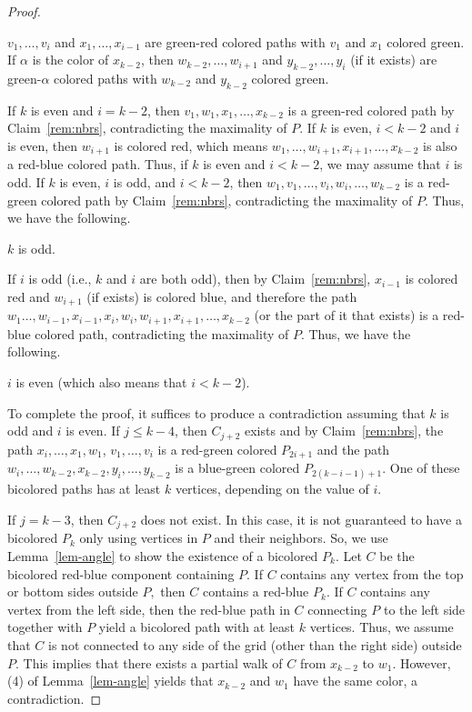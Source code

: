 \documentclass[10pt,a4paper]{amsart}
\begin{document}
\begin{proof}
\begin{claim}\label{rem:nbrs}
$v_1,\dots,v_i$ and $x_1,\dots,x_{i-1}$ are green-red colored paths with $v_1$ and $x_1$ colored green. If $\alpha$ is the color of $x_{k-2}$, then $w_{k-2},\dots,w_{i+1}$ and $y_{k-2},\dots,y_i$ (if it exists) are green-$\alpha$ colored paths with $w_{k-2}$ and $y_{k-2}$ colored green. 
\end{claim} 
 

If $k$ is even and $i=k-2$, then $v_1,w_1,x_1,\dots,x_{k-2}$ is a green-red colored path by Claim~\ref{rem:nbrs}, contradicting the maximality of $P.$ If $k$ is even, $i<k-2$ and $i$ is even, then $w_{i+1}$ is colored red, which means $w_1,\dots,w_{i+1},x_{i+1},\dots,x_{k-2}$ is also a red-blue colored path. Thus, if $k$ is even and $i<k-2$, we may assume that $i$ is odd. If $k$ is even, $i$ is odd, and $i<k-2$, then $w_1,v_1,\dots,v_i,w_i,\dots,w_{k-2}$ is a red-green colored path by Claim~\ref{rem:nbrs}, contradicting the maximality of $P.$ Thus, we have the following. 
\begin{claim}\label{clm:k_odd}
$k$ is odd.
\end{claim}
If $i$ is odd (i.e., $k$ and $i$ are both odd), then by Claim~\ref{rem:nbrs}, $x_{i-1}$ is colored red and $w_{i+1}$ (if exists) is colored blue, and therefore the path $w_1\dots,w_{i-1},x_{i-1},x_i,w_i,w_{i+1},x_{i+1},\dots,x_{k-2}$ (or the part of it that exists) is a red-blue colored path, contradicting the maximality of $P.$ Thus, we have the following. 
\begin{claim}\label{clm:i_even}
    $i$ is even (which also means that $i<k-2$).
\end{claim}
To complete the proof, it suffices to produce a contradiction assuming that $k$ is odd and $i$ is even. 
If $j\leq k-4$, then $C_{j+2}$ exists and by Claim~\ref{rem:nbrs}, the path $x_i, \dots, x_1, w_1$, $v_1,\dots,v_i$ is a red-green colored $P_{2i+1}$ and 
the path $w_i, \dots, w_{k-2}, x_{k-2}, y_i, \dots, y_{k-2}$ 
is a blue-green colored $P_{2(k-i-1)+1}$. One of these bicolored paths has at least $k$ vertices, depending on the value of $i$.

If $j=k-3$, then $C_{j+2}$ does not exist. In this case, it is not guaranteed to have a bicolored $P_k$ only using vertices in $P$ and their neighbors.  So, we use Lemma~\ref{lem-angle} to show the existence of a bicolored $P_k$.  Let $C$ be the bicolored red-blue component containing $P.$ If $C$ contains any vertex from the top or bottom sides outside $P,$ then $C$ contains a red-blue $P_k.$ If $C$ contains any vertex from the left side, then the red-blue path in $C$ connecting $P$ to the left side together with $P$ yield a bicolored path with at least $k$ vertices. Thus, we assume that $C$ is not connected to any side of the grid (other than the right side) outside $P$. This implies that there exists a partial walk of $C$ from $x_{k-2}$ to $w_1$. However, (4) of Lemma~\ref{lem-angle} yields that $x_{k-2}$ and $w_1$ have the same color, a contradiction. 
\end{proof}
\end{document}

